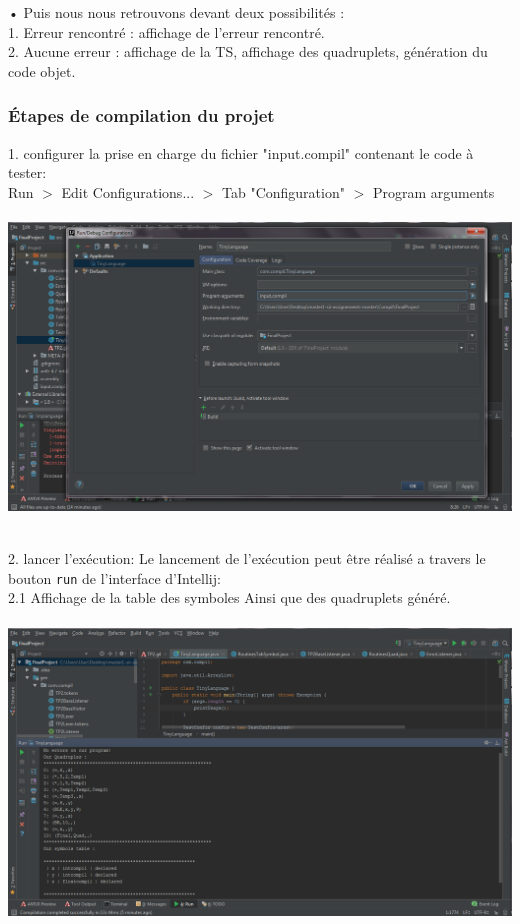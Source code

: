 \documentclass[12pt]{article}
\begin{document}
•	Puis nous nous retrouvons devant deux possibilités :\\
1.	Erreur rencontré : affichage de l'erreur rencontré.\\
2.	Aucune erreur : affichage de la TS, affichage des quadruplets, génération du code objet.\\


\subsubsection{Étapes de compilation du projet}

1. configurer la prise en charge du fichier "input.compil" contenant le code à tester:\\ 
Run $>$ Edit Configurations... $>$ Tab "Configuration" $>$ Program arguments\\
\texttt{ }\\
\includegraphics[width=1\textwidth]{IMG/Config_Exe.png}


\texttt{ }\\
2. lancer l'exécution:
Le lancement de l'exécution peut être réalisé a travers le bouton \texttt{run} de l'interface d'Intellij: \\

2.1 Affichage de la table des symboles Ainsi que des quadruplets généré.\\
\texttt{ }\\
\includegraphics[width=1\textwidth]{IMG/Exe_TS_Quad.png}
\end{document}
